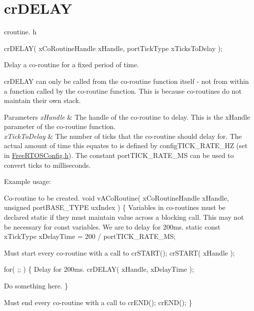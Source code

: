 \hypertarget{group__cr_d_e_l_a_y}{\section{cr\-D\-E\-L\-A\-Y}
\label{group__cr_d_e_l_a_y}
}
croutine. h 
\begin{DoxyPre}
 crDELAY( xCoRoutineHandle xHandle, portTickType xTicksToDelay );\end{DoxyPre}


Delay a co-\/routine for a fixed period of time.

cr\-D\-E\-L\-A\-Y can only be called from the co-\/routine function itself -\/ not from within a function called by the co-\/routine function. This is because co-\/routines do not maintain their own stack.


\begin{DoxyParams}{Parameters}
{\em x\-Handle} & The handle of the co-\/routine to delay. This is the x\-Handle parameter of the co-\/routine function.\\
\hline
{\em x\-Tick\-To\-Delay} & The number of ticks that the co-\/routine should delay for. The actual amount of time this equates to is defined by config\-T\-I\-C\-K\-\_\-\-R\-A\-T\-E\-\_\-\-H\-Z (set in \hyperlink{_free_r_t_o_s_config_8h_source}{Free\-R\-T\-O\-S\-Config.\-h}). The constant port\-T\-I\-C\-K\-\_\-\-R\-A\-T\-E\-\_\-\-M\-S can be used to convert ticks to milliseconds.\\
\hline
\end{DoxyParams}
Example usage\-: 
\begin{DoxyPre}
Co-routine to be created.
 void vACoRoutine( xCoRoutineHandle xHandle, unsigned portBASE\_TYPE uxIndex )
 \{
Variables in co-routines must be declared static if they must maintain value across a blocking call.
This may not be necessary for const variables.
We are to delay for 200ms.
 static const xTickType xDelayTime = 200 / portTICK\_RATE\_MS;\end{DoxyPre}



\begin{DoxyPre}Must start every co-routine with a call to crSTART();
     crSTART( xHandle );\end{DoxyPre}



\begin{DoxyPre}     for( ;; )
     \{
Delay for 200ms.
        crDELAY( xHandle, xDelayTime );\end{DoxyPre}



\begin{DoxyPre}Do something here.
     \}\end{DoxyPre}



\begin{DoxyPre}Must end every co-routine with a call to crEND();
     crEND();
 \}\end{DoxyPre}
 